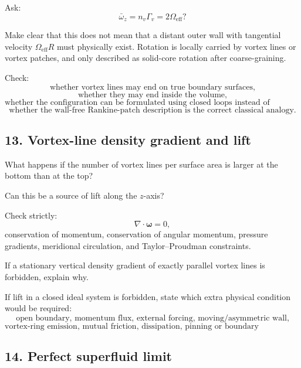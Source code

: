 \documentclass[11pt]{article}
\begin{document}
            Ask:
            \[
                \bar{\omega}_z
                =
                n_v\Gamma_v
                =
                2\Omega_{\mathrm{eff}}?
            \]
            
            Make clear that this does not mean that a distant outer wall with tangential velocity \(\Omega_{\mathrm{eff}}R\) must physically exist. Rotation is locally carried by vortex lines or vortex patches, and only described as solid-core rotation after coarse-graining.
            
            Check:
            \[
                \text{whether vortex lines may end on true boundary surfaces,}
            \]
            \[
                \text{whether they may end inside the volume,}
            \]
            \[
                \text{whether the configuration can be formulated using closed loops instead of anchors,}
            \]
            \[
                \text{whether the wall-free Rankine-patch description is the correct classical analogy.}
            \]
        
        \subsection{13. Vortex-line density gradient and lift}
            
            What happens if the number of vortex lines per surface area is larger at the bottom than at the top?
            
            Can this be a source of lift along the \(z\)-axis?
            
            Check strictly:
            \[
                \nabla\cdot\boldsymbol{\omega}=0,
            \]
            conservation of momentum, conservation of angular momentum, pressure gradients, meridional circulation, and Taylor--Proudman constraints.
            
            If a stationary vertical density gradient of exactly parallel vortex lines is forbidden, explain why.
            
            If lift in a closed ideal system is forbidden, state which extra physical condition would be required:
            \[
                \text{open boundary, momentum flux, external forcing, moving/asymmetric wall,}
            \]
            \[
                \text{vortex-ring emission, mutual friction, dissipation, pinning or boundary interaction.}
            \]
        
        \subsection{14. Perfect superfluid limit}
            
\end{document}

